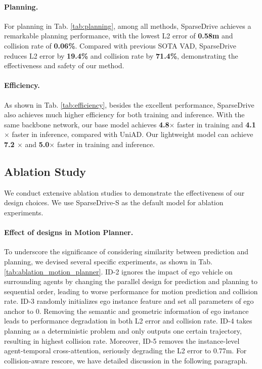 \paragraph{Planning.} For planning in Tab. \ref{tab:planning}, among all methods, SparseDrive achieves a remarkable planning performance, with the lowest L2 error of \textbf{0.58m} and collision rate of \textbf{0.06\%}. Compared with previous SOTA VAD\cite{vad}, SparseDrive reduces L2 error by \textbf{19.4\%} and collision rate by \textbf{71.4\%}, demonstrating the effectiveness and safety of our method. 

\paragraph{Efficiency.} As shown in Tab. \ref{tab:efficiency}, besides the excellent performance, SparseDrive also achieves much higher efficiency for both training and inference. With the same backbone network, our base model achieves \textbf{4.8$\times$} faster in training and \textbf{4.1$\times$} faster in inference, compared with UniAD\cite{uniad}. Our lightweight model can achieve \textbf{7.2 $\times$} and \textbf{5.0$\times$} faster in training and inference. \textbf{}





\subsection{Ablation Study}
We conduct extensive ablation studies to demonstrate the effectiveness of our design choices. We use SparseDrive-S as the default model for ablation experiments.

\paragraph{Effect of designs in Motion Planner.}
To underscore the significance of considering similarity between prediction and planning, we devised several specific experiments, as shown in Tab. \ref{tab:ablation_motion_planner}. ID-2 ignores the impact of ego vehicle on surrounding agents by changing the parallel design for prediction and planning to sequential order, leading to worse performance for motion prediction and collision rate. ID-3 randomly initializes ego instance feature and set all parameters of ego anchor to 0. Removing the semantic and geometric information of ego instance leads to performance degradation in both L2 error and collision rate. ID-4 takes planning as a deterministic problem and only outputs one certain trajectory, resulting in highest collision rate. Moreover, ID-5 removes the instance-level agent-temporal cross-attention, seriously degrading the L2 error to 0.77m. For collision-aware rescore, we have detailed discussion in the following paragraph.

